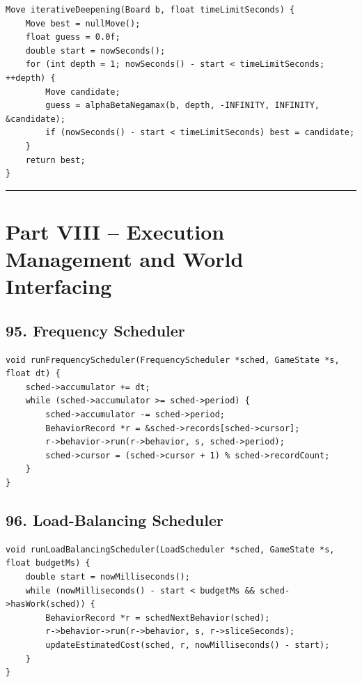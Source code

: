 \documentclass[10pt,letterpaper]{article}
\begin{document}
\begin{verbatim}
Move iterativeDeepening(Board b, float timeLimitSeconds) {
    Move best = nullMove();
    float guess = 0.0f;
    double start = nowSeconds();
    for (int depth = 1; nowSeconds() - start < timeLimitSeconds; ++depth) {
        Move candidate;
        guess = alphaBetaNegamax(b, depth, -INFINITY, INFINITY, &candidate);
        if (nowSeconds() - start < timeLimitSeconds) best = candidate;
    }
    return best;
}
\end{verbatim}

\medskip\hrule\medskip

\clearpage
\section*{Part VIII -- Execution Management and World Interfacing}

\subsection*{95. Frequency Scheduler}
{}

\begin{verbatim}
void runFrequencyScheduler(FrequencyScheduler *sched, GameState *s, float dt) {
    sched->accumulator += dt;
    while (sched->accumulator >= sched->period) {
        sched->accumulator -= sched->period;
        BehaviorRecord *r = &sched->records[sched->cursor];
        r->behavior->run(r->behavior, s, sched->period);
        sched->cursor = (sched->cursor + 1) % sched->recordCount;
    }
}
\end{verbatim}

\subsection*{96. Load-Balancing Scheduler}
{}

\begin{verbatim}
void runLoadBalancingScheduler(LoadScheduler *sched, GameState *s, float budgetMs) {
    double start = nowMilliseconds();
    while (nowMilliseconds() - start < budgetMs && sched->hasWork(sched)) {
        BehaviorRecord *r = schedNextBehavior(sched);
        r->behavior->run(r->behavior, s, r->sliceSeconds);
        updateEstimatedCost(sched, r, nowMilliseconds() - start);
    }
}
\end{verbatim}
\end{document}
